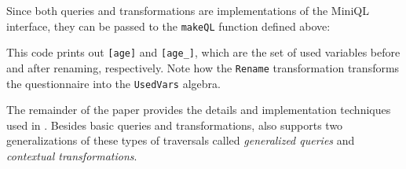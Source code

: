 
Since both queries and transformations are implementations of the MiniQL interface, they can be passed to the \lstinline{makeQL} function defined above:

This code prints out  \lstinline{[age]} and \lstinline{[age_]}, which
are the set of used variables before and after renaming, respectively.
Note how the \lstinline{Rename} transformation transforms the questionnaire into the \lstinline{UsedVars} algebra.

The remainder of the paper provides the details and implementation
techniques used in \Name. Besides basic queries and transformations,
\name also supports two generalizations of these types of traversals
called \emph{generalized queries} and \emph{contextual transformations}.

